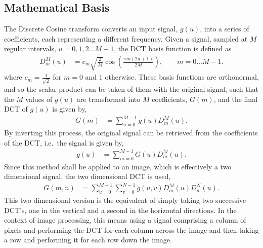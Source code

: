 \subsection{Mathematical Basis} %
\label{sub:mathematical_basis}
The Discrete Cosine transform converts an input signal, $g(u)$, into a series of coefficients, each representing a different frequency. Given a signal, sampled at $M$ regular intervals, $u=0,1,2\ldots M-1$, the DCT basis function is defined as
\begin{align}
	D_m^M(u) &= c_m \sqrt{\frac{2}{M}}\cos\left(\frac{\pi m(2u+1)}{2M}\right), \qquad m=0\ldots M-1.
\end{align}
where $c_m=\frac{1}{\sqrt 2}$ for $m=0$ and 1 otherwise. These basis functions are orthonormal, and so the scalar product can be taken of them with the original signal, such that the $M$ values of $g(u)$ are transformed into $M$ coefficients, $G(m)$, and the final DCT of $g(u)$ is given by,
\begin{align}
	G(m) &= \sum_{u=0}^{M-1} g(u) D_m^M(u).
\end{align}
By inverting this process, the original signal can be retrieved from the coefficients of the DCT, i.e.\ the signal is given by,
\begin{align}
	g(u) &= \sum_{m=0}^{M-1} G(u) D_m^M(u).
\end{align}
Since this method shall be applied to an image, which is effectively a two dimensional signal, the two dimensional DCT is used,
\begin{align}
	G(m,n) &= \sum_{u=0}^{M-1}\sum_{v=0}^{N-1} g(u,v) D_m^M(u)D_n^N(u).
\end{align}
This two dimensional version is the equivalent of simply taking two successive DCT's, one in the vertical and a second in the horizontal directions. In the context of image processing, this means using a signal comprising a column of pixels and performing the DCT for each column across the image and then taking a row and performing it for each row down the image.

